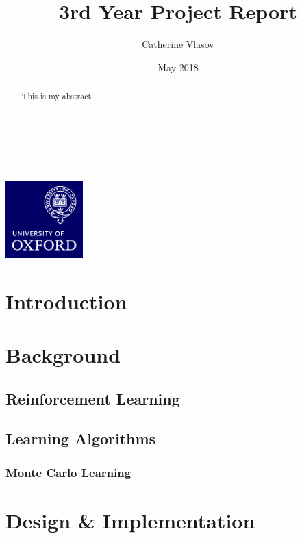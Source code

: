 \documentclass[11pt,a4paper]{report}
\author{Catherine Vlasov}
\title{3rd Year Project Report}
\date{May 2018}
\begin{document}
\makeatletter
	\begin{titlepage}
		\vspace*{\fill}
		\begin{center}
			{\huge \bfseries \@title }
			\\[4ex]
			{\LARGE  \@author}
			\\[2ex]
			{\large \@date}
			\\[50ex]
			\includegraphics[width=30mm]{oxlogo.png}
		\end{center}
		\vspace*{\fill}
	\end{titlepage}
\makeatother

\begin{abstract}
This is my abstract
\end{abstract}

\tableofcontents


\chapter{Introduction}


\chapter{Background}


\section{Reinforcement Learning}


\section{Learning Algorithms}


\subsection{Monte Carlo Learning}


\chapter{Design \& Implementation}
\end{document}
